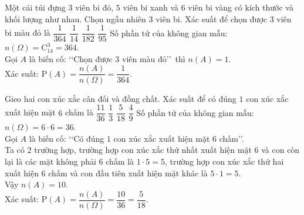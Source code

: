 \begin{ex}%
	Một cái túi đựng $3$ viên bi đỏ, $5$ viên bi xanh và $6$ viên bi vàng có kích thước và khối lượng như nhau. Chọn ngẫu nhiên $3$ viên bi. Xác suất để chọn được $3$ viên bi màu đỏ là
	\choice
	{\True $\dfrac{1}{364}$}
	{$\dfrac{1}{14}$}
	{$\dfrac{1}{182}$}
	{$\dfrac{1}{95}$}
	\loigiai
	{
		Số phần tử của không gian mẫu: $n(\Omega)=\mathrm{C}^3_{14}=364$.\\
		Gọi $A$ là biến cố: \lq\lq Chọn được $3$ viên màu đỏ\rq\rq \, thì $n(A)=1$.\\
		Xác suất: $\mathrm{P}(A)=\dfrac{n(A)}{n(\Omega)} =\dfrac{1}{364}$.	
	}	
\end{ex}
\begin{ex}%
	Gieo hai con xúc xắc cân đối và đồng chất. Xác suất để có đúng $1$ con xúc xắc xuất hiện mặt $6$ chấm là
	\choice
	{$\dfrac{11}{36}$}
	{$\dfrac{1}{3}$}
	{\True $\dfrac{5}{18}$}
	{$\dfrac{4}{9}$}
	\loigiai
	{
		Số phần tử của không gian mẫu: $n(\Omega)=6\cdot 6=36$.\\
		Gọi $A$ là biến cố: \lq\lq Có đúng $1$ con xúc xắc xuất hiện mặt $6$ chấm\rq\rq .\\
		Ta có 2 trường hợp, trường hợp con xúc xắc thứ nhất xuất hiện mặt 6 và con còn lại là các mặt không phải 6 chấm là $ 1 \cdot 5 =5 $, trường hợp con xúc xắc thứ hai xuất hiện 6 chấm và con đầu tiên xuất hiện mặt khác là $ 5 \cdot 1 = 5 $.\\
		Vậy $n(A)=10$.\\
		Xác suất: $\mathrm{P}(A)=\dfrac{n(A)}{n(\Omega)} =\dfrac{10}{36}=\dfrac{5}{18}$.	
	}	
\end{ex}
